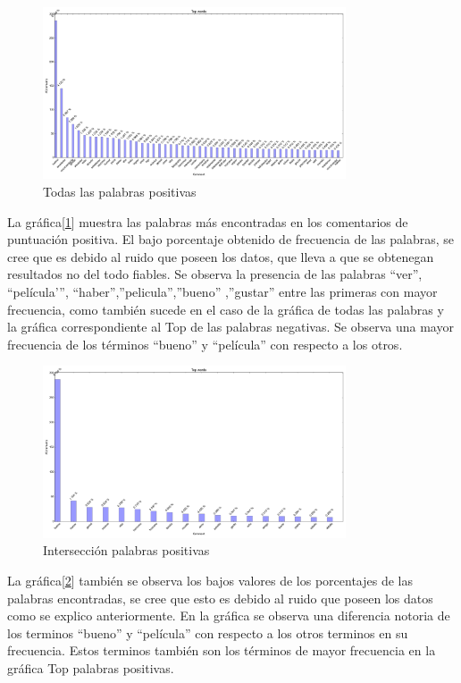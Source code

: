 \documentclass[12pt]{article}
\begin{document}
\begin{figure}[!h]
  \centering
    \includegraphics[width=0.8\textwidth]{./fig/PositiveWords.png}
  \caption{Todas las palabras positivas}
  \label{fig:pos}
\end{figure} 

La gráfica[\ref{fig:pos}] muestra las palabras más encontradas en los comentarios de puntuación positiva. El bajo porcentaje obtenido de frecuencia de las palabras, se cree que es debido al ruido que poseen los datos, que lleva a que se obtenegan resultados no del todo fiables. Se observa la presencia de las palabras “ver”, “película'”, “haber”,”pelicula”,”bueno” ,”gustar” entre las primeras con mayor frecuencia, como también sucede en el caso de la gráfica de todas las palabras y la gráfica correspondiente al Top de las palabras negativas. Se observa una mayor frecuencia de los términos “bueno” y “película” con respecto a los otros.


\begin{figure}[!h]
  \centering
    \includegraphics[width=0.8\textwidth]{./fig/PositiveSubjetiveWords.png}
  \caption{Intersección palabras positivas}
  \label{fig:possub}
\end{figure} 


La gráfica[\ref{fig:possub}] también se observa los bajos valores de los porcentajes de las palabras encontradas, se cree que esto es debido al ruido que poseen los datos como se explico anteriormente. En la gráfica se observa una diferencia notoria de los terminos “bueno” y “película” con respecto a los otros terminos en su frecuencia. Estos terminos también son los términos de mayor frecuencia en la gráfica Top palabras positivas.
\end{document}
